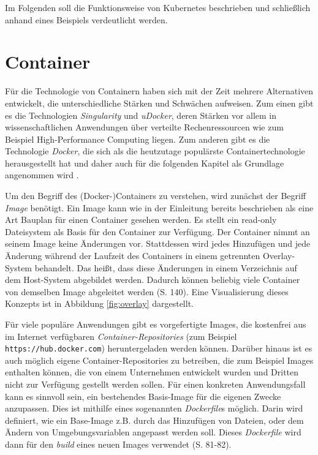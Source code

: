 \documentclass[11pt,a4paper]{article}
\begin{document}
Im Folgenden soll die Funktionsweise von Kubernetes beschrieben und schließlich anhand eines Beispiels
verdeutlicht werden.

\section{Container}
\label{sec:Container}

Für die Technologie von Containern haben sich mit der Zeit mehrere Alternativen entwickelt, die unterschiedliche
Stärken und Schwächen aufweisen. Zum einen gibt es die Technologien \emph{Singularity} und \emph{uDocker}, deren Stärken
vor allem in wissenschaftlichen Anwendungen über verteilte Rechenressourcen wie zum Beispiel High-Performance Computing
liegen. Zum anderen gibt es die Technologie \emph{Docker}, die sich als die heutzutage populärste Containertechnologie
herausgestellt hat und daher auch für die folgenden Kapitel als Grundlage angenommen wird \cite{Bentaleb_Belloum_Sebaa_El-Maouhab_2021}.

Um den Begriff des (Docker-)Containers zu verstehen, wird zunächst der Begriff \emph{Image} benötigt.
Ein Image kann wie in der Einleitung bereits beschrieben als eine Art Bauplan für einen Container gesehen werden.
Es stellt ein read-only Dateisystem als Basis für den Container zur Verfügung. Der Container nimmt an seinem Image
keine Änderungen vor. Stattdessen wird jedes Hinzufügen und jede Änderung während der Laufzeit des Containers in einem
getrennten Overlay-System behandelt.
Das heißt, dass diese Änderungen in einem Verzeichnis auf dem Host-System abgebildet werden.
Dadurch können beliebig viele Container von demselben Image abgeleitet werden \cite{kofler2021docker} (S. 140).
Eine Visualisierung dieses Konzepts ist in Abbildung \ref{fig:overlay} dargestellt.


Für viele populäre Anwendungen gibt es vorgefertigte Images, die kostenfrei aus im Internet verfügbaren
\emph{Container-Repositories} (zum Beispiel \lstinline|https://hub.docker.com|) heruntergeladen werden können.
Darüber hinaus ist es auch möglich eigene Container-Repositories zu betreiben,
die zum Beispiel Images enthalten können, die von einem Unternehmen entwickelt wurden
und Dritten nicht zur Verfügung gestellt werden sollen.
Für einen konkreten Anwendungsfall kann es sinnvoll sein, ein bestehendes Basis-Image für die eigenen Zwecke anzupassen.
Dies ist mithilfe eines sogenannten \emph{Dockerfile}s möglich. Darin wird definiert, wie ein Base-Image z.B. durch das Hinzufügen von Dateien,
oder dem Ändern von Umgebungsvariablen angepasst werden soll. Dieses \emph{Dockerfile} wird dann für den \emph{build}
eines neuen Images verwendet \cite{kofler2021docker} (S. 81-82).
\end{document}
